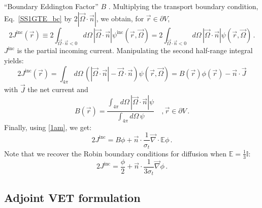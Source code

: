 \documentclass[12pt]{report}
\newcommand{\vr}{\vec{r}}
\newcommand{\vJ}{\vec{J}}
\newcommand{\vO}{\vec{\Omega}}
\renewcommand{\div}{\vec{\nabla} \cdot}
\newcommand{\grad}{\vec{\nabla}}
\newcommand{\bound}{\partial V}
\newcommand{\vn}{\vec{n}}
\newcommand{\Edd}{\mathbb{E}}
\newcommand{\BEdd}{B}
\newcommand{\sigt}{\sigma_t}
\begin{document}
``Boundary Eddington Factor'' $\BEdd$ \cite{Miften}. Multiplying the transport boundary condition,
Eq.~\eqref{SS1GTE_bc} by $2 | \vO \cdot \vn |$, we obtain, for $\vr \in \bound$,
\begin{equation}
2 J^{\text{inc}}(\vr) \equiv  2 \int_{\vO \cdot \vn <0 }  d \Omega\, | \vO \cdot \vec{n} | \psi^{\text{inc}}(\vr,\vO) 
= 2\int_{\vO \cdot \vn <0 } d \Omega\,  | \vO \cdot \vn |  \psi(\vr,\vO) \,.
\end{equation}
$J^{\text{inc}}$ is the partial incoming current. 
Manipulating the second half-range integral yields:
\begin{equation}
2 J^{\text{inc}}(\vr) = \int_{4\pi} d \Omega\,  \left( | \vO \cdot \vn |- \vO\cdot\vn\right)  \psi(\vr,\vO) 
= \BEdd(\vr) \phi(\vr) - \vn \cdot \vJ 
\end{equation}
with $\vJ$ the net current and
\begin{equation}
\BEdd(\vr) = \frac{\int_{4 \pi} d\Omega \, | \vO \cdot \vn | \psi}{\int_{4\pi} d\Omega \, \psi} \quad , \vr \in \bound \,.
\end{equation}
Finally, using \eqref{1am}, we get:
\begin{equation}
2 J^{\text{inc}} = \BEdd \phi + \vn \cdot \frac{1}{\sigt} \div \Edd \phi \,.
\end{equation}
Note that we recover the Robin boundary conditions for diffusion when $\Edd = \tfrac{1}{3} \mathbb{I}$:
\[
2 J^{\text{inc}} = \frac{\phi}{2} + \vn \cdot \frac{1}{3\sigt} \grad \phi \,.
\]


\subsection{Adjoint VET formulation}
\end{document}
